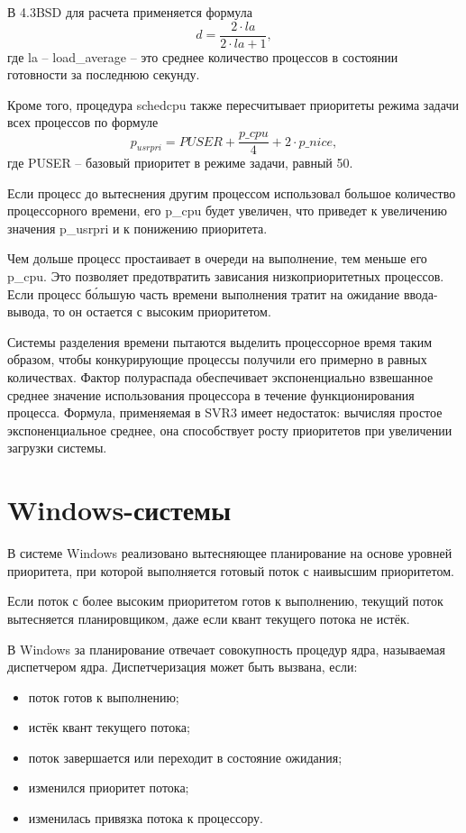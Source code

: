 В {\ttfamily 4.3BSD} для расчета применяется формула
\[
d = \frac{2\cdot la}{2\cdot la + 1},
\]
где {\ttfamily la} -- {\ttfamily load{\_}average} -- это среднее количество процессов в состоянии готовности за последнюю секунду.

Кроме того, процедура {\ttfamily schedcpu} также пересчитывает приоритеты режима задачи всех процессов по формуле
\[
{p_{usrpri}} = PUSER + \frac{p{\_}cpu}{4} + 2\cdot {p{\_}nice},
\]
где {\ttfamily PUSER} -- базовый приоритет в режиме задачи, равный 50.

Если процесс до вытеснения другим процессом использовал большое количество процессорного времени, его {\ttfamily p{\_}cpu} будет увеличен, что приведет к увеличению значения {\ttfamily p{\_}usrpri} и к понижению приоритета.

Чем дольше процесс простаивает в очереди на выполнение, тем меньше его {\ttfamily p{\_}cpu}. Это позволяет предотвратить зависания низкоприоритетных процессов. Если процесс б\'{о}льшую часть времени выполнения тратит на ожидание ввода-вывода, то он остается с высоким приоритетом.

Системы разделения времени пытаются выделить процессорное время таким образом, чтобы конкурирующие процессы получили его примерно в равных количествах. Фактор полураспада обеспечивает экспоненциально взвешанное среднее значение использования процессора в течение функционирования процесса. Формула, применяемая в SVR3 имеет недостаток: вычисляя простое экспоненциальное среднее, она способствует росту приоритетов при увеличении загрузки системы.

\section{Windows-системы}

В системе Windows реализовано вытесняющее планирование на основе уровней приоритета, при которой выполняется готовый поток с наивысшим приоритетом.

Если поток с более высоким приоритетом готов к выполнению, текущий поток вытесняется планировщиком, даже если квант текущего потока не истёк.

В {\ttfamily Windows} за планирование отвечает совокупность процедур ядра, называемая диспетчером ядра. Диспетчеризация может быть вызвана, если:
\begin{itemize}
	\item поток готов к выполнению;
	\item истёк квант текущего потока;
	\item поток завершается или переходит в состояние ожидания;
	\item изменился приоритет потока;
	\item изменилась привязка потока к процессору.
\end{itemize}

